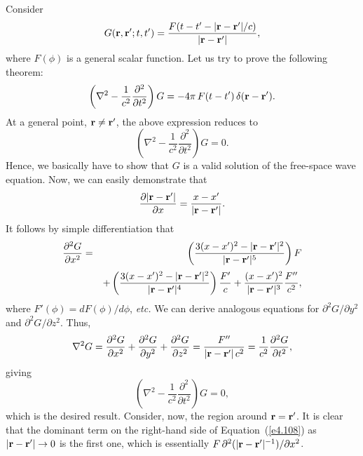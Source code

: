 Consider 
\begin{equation}
G({\bf r}, {\bf r}'; t, t') = \frac{F(t-t' - |{\bf r} - {\bf r}'|/c)}{|{\bf r} - {\bf r}'|},
\end{equation}
where $F(\phi)$ is a general scalar function. Let us try to prove the following theorem:
\begin{equation}
\left(\nabla^2 - \frac{1}{c^2} \frac{\partial^2}{\partial t^2} \right)
G = - 4\pi \,F(t-t')\,\delta({\bf r}- {\bf r}').
\end{equation}
At a general point, ${\bf r} \neq {\bf r'}$, the above expression reduces to
\begin{equation}
\left(\nabla^2 - \frac{1}{c^2} \frac{\partial^2}{\partial t^2} \right)
G=0.
\end{equation}
Hence, we basically have to show that $G$ is a valid  solution of the free-space
wave equation. 
Now, we can easily demonstrate that
\begin{equation}
\frac{\partial |{\bf r} - {\bf r}'|}{\partial x} = \frac{x-x'}{|{\bf r} - {\bf r}'|}.
\end{equation}
It follows by simple differentiation that
\begin{eqnarray}\label{e4.108}
\frac{\partial^2 G}{\partial x^2}& =& \left(\frac{3(x-x')^2 - |{\bf r} - {\bf r}'|^2}
{|{\bf r} - {\bf r}'|^5 } \right) F
\nonumber\\[0.5ex]
&&  +\left(\frac{3(x-x')^2 - |{\bf r} - {\bf r}'|^2}{|{\bf r} - {\bf r}'|^4 } \right)
\frac{ F'}{c} + \frac{(x-x')^2}{|{\bf r} - {\bf r}'|^3} \frac{F''}{c^2},
\end{eqnarray}
where $F'(\phi) = d F(\phi)/d\phi$, {\em etc.} We can derive analogous equations for $\partial^2 G/\partial y^2$
and $\partial^2 G/\partial z^2$. 
Thus,
\begin{equation}
\nabla^2 G = \frac{\partial^2 G}{\partial x^2} + \frac{\partial^2 G}
{\partial y^2} + \frac{\partial^2 G}{\partial z^2} = \frac{F''}{|{\bf r} - {\bf r'}|\,
c^2} = \frac{1}{c^2} \frac{\partial^2 G}{\partial t^2},
\end{equation}
giving
\begin{equation}
\left(\nabla^2 - \frac{1}{c^2}\frac{\partial^2}{\partial t^2} \right) G = 0,
\end{equation}
which is the desired result. Consider, now, the region around ${\bf r} = {\bf r}'$. It is
clear that the dominant term on the right-hand
side  of Equation~(\ref{e4.108}) as $|{\bf r} - {\bf r}'|\rightarrow 0$ is
the first one, which is essentially
$F\, \partial^2(|{\bf r} - {\bf r'}|^{-1})/\partial x^2$.
